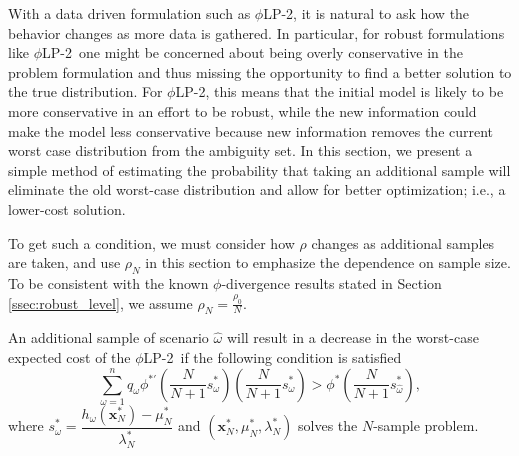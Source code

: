 \documentclass[ijoc,nonblindrev]{informs3} %
\newcommand{\x}{\mathbf{x}}
\newcommand{\plp}{$\phi$LP-2}
\begin{document}
With a data driven formulation such as \plp, it is natural to ask how the behavior changes as more data is gathered.
In particular, for robust formulations like \plp\ one might be concerned about being overly conservative in the problem formulation and thus missing the opportunity to find a better solution to the true distribution.
For \plp, this means that the initial model is likely to be more conservative in an effort to be robust, while the new information could make the model less conservative because new information removes the current worst case distribution from the ambiguity set.  
In this section, we present a simple method of estimating the probability that taking an additional sample will eliminate the old worst-case distribution and allow for better optimization; i.e., a lower-cost solution.

To get such a condition, we must consider how $\rho$ changes as additional samples are taken, and use $\rho_N$ in this section to emphasize the dependence on sample size.
To be consistent with the known $\phi$-divergence results stated in Section \ref{ssec:robust_level}, we assume $\rho_N = \frac{\rho_0}{N}$.

\begin{proposition}
	An additional sample of scenario $\hat{\omega}$ will result in a decrease in the worst-case expected cost of the \plp\ if the following condition is satisfied
	\begin{equation} \label{eq:cost_decrease_cond}
		\sum_{\omega=1}^n q_\omega \phi^{*\prime}\left(\frac{N}{N+1}s^*_\omega\right) \left(\frac{N}{N+1}s^*_\omega\right) > \phi^*\left(\frac{N}{N+1}s^*_{\hat{\omega}}\right),
	\end{equation}
	where $s^*_\omega = \dfrac{h_\omega(\x^*_N) - \mu^*_N}{\lambda^*_N}$ and $(\x^*_N,\mu^*_N,\lambda^*_N)$ solves the $N$-sample problem.
\end{proposition}
\end{document}
